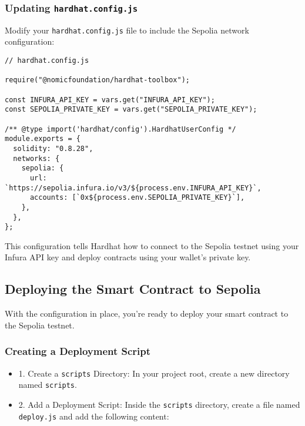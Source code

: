 \documentclass[12pt]{article}
\begin{document}
\subsubsection{Updating \texttt{hardhat.config.js}}

Modify your \texttt{hardhat.config.js} file to include the Sepolia network configuration:

\begin{verbatim}
// hardhat.config.js

require("@nomicfoundation/hardhat-toolbox");

const INFURA_API_KEY = vars.get("INFURA_API_KEY");
const SEPOLIA_PRIVATE_KEY = vars.get("SEPOLIA_PRIVATE_KEY");

/** @type import('hardhat/config').HardhatUserConfig */
module.exports = {
  solidity: "0.8.28",
  networks: {
    sepolia: {
      url: `https://sepolia.infura.io/v3/${process.env.INFURA_API_KEY}`,
      accounts: [`0x${process.env.SEPOLIA_PRIVATE_KEY}`],
    },
  },
};
\end{verbatim}

This configuration tells Hardhat how to connect to the Sepolia testnet using your Infura API key and deploy contracts using your wallet's private key.

\subsection{Deploying the Smart Contract to Sepolia}

With the configuration in place, you're ready to deploy your smart contract to the Sepolia testnet.

\subsubsection{Creating a Deployment Script}

\begin{itemize}
\item 1. Create a \texttt{scripts} Directory: In your project root, create a new directory named \texttt{scripts}.

\item 2. Add a Deployment Script: Inside the \texttt{scripts} directory, create a file named \texttt{deploy.js} and add the following content:
\end{itemize}
\end{document}
